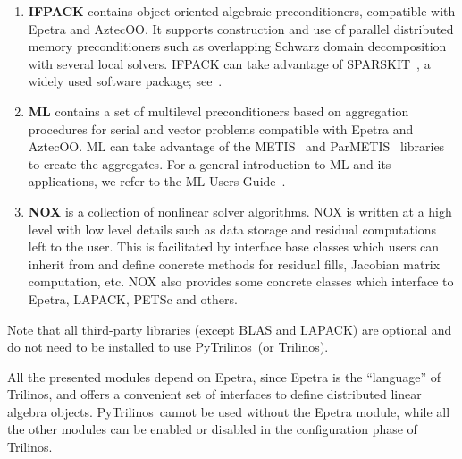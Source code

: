 \documentclass[acmtocl]{acmtrans2m}
\newcommand{\PyTrilinos}{{PyTrilinos}}
\begin{document}
\begin{enumerate}
\item {\bf IFPACK} contains object-oriented algebraic preconditioners,
  compatible with Epetra and AztecOO.  It supports construction and
  use of parallel distributed memory preconditioners such as
  overlapping Schwarz domain decomposition with several local solvers.
  IFPACK can take advantage of SPARSKIT~\cite{sparskit}, a widely used
  software package; see~\cite{ifpack-guide}.

\item {\bf ML} contains a set of multilevel preconditioners based on
  aggregation procedures for serial and vector problems compatible
  with Epetra and AztecOO. ML can take advantage of the
  METIS~\cite{metis} and ParMETIS~\cite{parmetis} libraries to create
  the aggregates.  For a general introduction to ML and its
  applications, we refer to the ML Users Guide~\cite{ml-guide}.

\item {\bf NOX} is a collection of nonlinear solver algorithms.  NOX
  is written at a high level with low level details such as data
  storage and residual computations left to the user.  This is
  facilitated by interface base classes which users can inherit from
  and define concrete methods for residual fills, Jacobian matrix
  computation, etc.  NOX also provides some concrete classes which
  interface to Epetra, LAPACK, PETSc and others.  

\end{enumerate}

Note that all third-party libraries (except BLAS and LAPACK) are
optional and do not need to be installed to use \PyTrilinos\ (or
Trilinos).

All the presented modules depend on Epetra, since Epetra is the
``language'' of Trilinos, and offers a convenient set of interfaces to
define distributed linear algebra objects.  \PyTrilinos\ cannot be
used without the Epetra module, while all the other modules can be
enabled or disabled in the configuration phase of Trilinos.

\end{document}
